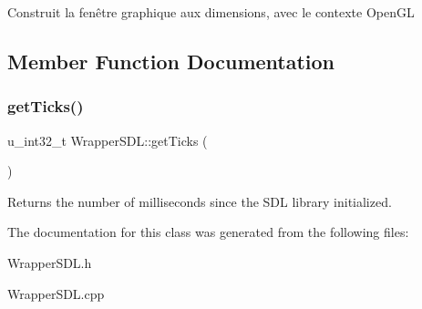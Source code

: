 Construit la fenêtre graphique aux dimensions, avec le contexte Open\+GL 

\subsection{Member Function Documentation}
\mbox{\label{classWrapperSDL_aae566cdc21799d852d48a49627f233dc}} 
\subsubsection{\texorpdfstring{getTicks()}{getTicks()}}
{\footnotesize\ttfamily u\+\_\+int32\+\_\+t Wrapper\+S\+D\+L\+::get\+Ticks (\begin{DoxyParamCaption}{ }\end{DoxyParamCaption})\hspace{0.3cm}{\ttfamily [static]}}

\begin{DoxyReturn}{Returns}
the number of milliseconds since the S\+DL library initialized. 
\end{DoxyReturn}


The documentation for this class was generated from the following files\+:\begin{DoxyCompactItemize}
\item 
Wrapper\+S\+D\+L.\+h\item 
Wrapper\+S\+D\+L.\+cpp\end{DoxyCompactItemize}

